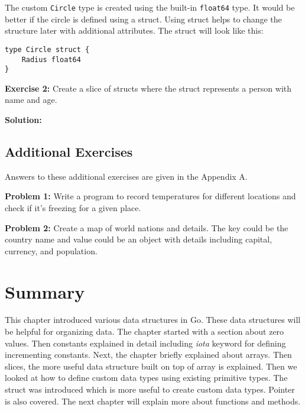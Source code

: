 

The custom \texttt{Circle} type is created using the
built-in \texttt{float64} type.  It would be better if the circle is
defined using a struct.  Using struct helps to change the structure
later with additional attributes.  The struct will look like this:

\begin{lstlisting}[numbers=none]
type Circle struct {
    Radius float64
}
\end{lstlisting}

\textbf{Exercise 2:} Create a slice of structs where the struct represents
a person with name and age.

\textbf{Solution:}



\subsection{Additional Exercises}

Answers to these additional exercises are given in the Appendix A.

\textbf{Problem 1:} Write a program to record temperatures for different locations and check if it's freezing for a given place.

\textbf{Problem 2:} Create a map of world nations and details. The key could
be the country name and value could be an object with details including capital,
currency, and population.

\section*{Summary}

This chapter introduced various data structures in Go. These data structures
will be helpful for organizing data. The chapter started with a section about
zero values. Then constants explained in detail including \textit{iota} keyword
for defining incrementing constants. Next, the chapter briefly explained about
arrays. Then slices, the more useful data structure built on top of array is
explained. Then we looked at how to define custom data types using existing
primitive types. The struct was introduced which is more useful to create custom
data types. Pointer is also covered. The next chapter will explain more about
functions and methods.
